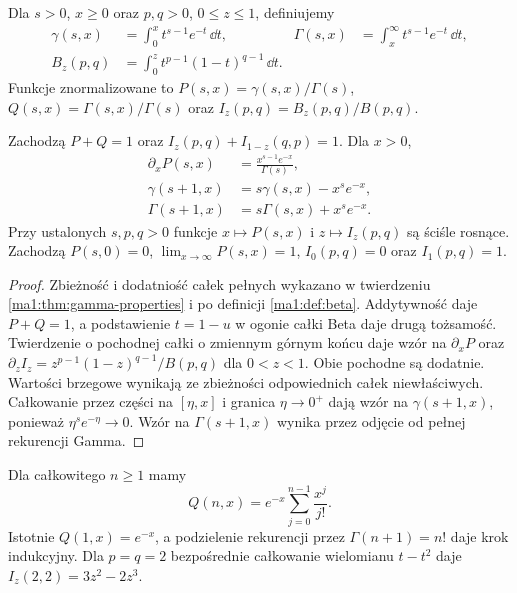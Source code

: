 \begin{definicja}
\label{ma1:def:incomplete-gamma-beta}
Dla $s>0$, $x\ge0$ oraz $p,q>0$, $0\le z\le1$,
definiujemy
\[
 \begin{aligned}
 \gamma(s,x)&=\int_0^x t^{s-1}e^{-t}\,\dd t,&
 \Gamma(s,x)&=\int_x^\infty t^{s-1}e^{-t}\,\dd t,\\
 B_z(p,q)&=\int_0^z t^{p-1}(1-t)^{q-1}\,\dd t.
 \end{aligned}
\]
Funkcje znormalizowane to $P(s,x)=\gamma(s,x)/\Gamma(s)$,
$Q(s,x)=\Gamma(s,x)/\Gamma(s)$ oraz
$I_z(p,q)=B_z(p,q)/B(p,q)$.
\end{definicja}
\begin{stwierdzenie}
\label{ma1:prop:incomplete-gamma-beta}
Zachodzą $P+Q=1$ oraz $I_z(p,q)+I_{1-z}(q,p)=1$.
Dla $x>0$,
\[
 \begin{aligned}
 \partial_x P(s,x)&=\frac{x^{s-1}e^{-x}}{\Gamma(s)},\\
 \gamma(s+1,x)&=s\gamma(s,x)-x^s e^{-x},\\
 \Gamma(s+1,x)&=s\Gamma(s,x)+x^s e^{-x}.
 \end{aligned}
\]
Przy ustalonych $s,p,q>0$ funkcje $x\mapsto P(s,x)$
i $z\mapsto I_z(p,q)$ są ściśle rosnące.
Zachodzą $P(s,0)=0$, $\lim_{x\to\infty}P(s,x)=1$,
$I_0(p,q)=0$ oraz $I_1(p,q)=1$.
\end{stwierdzenie}
\begin{proof}
Zbieżność i dodatniość całek pełnych wykazano
w twierdzeniu \ref{ma1:thm:gamma-properties}
i po definicji \ref{ma1:def:beta}.
Addytywność daje $P+Q=1$, a podstawienie $t=1-u$
w ogonie całki Beta daje drugą tożsamość.
Twierdzenie o pochodnej całki o zmiennym górnym
końcu daje wzór na $\partial_x P$ oraz
$\partial_z I_z=z^{p-1}(1-z)^{q-1}/B(p,q)$ dla $0<z<1$.
Obie pochodne są dodatnie. Wartości brzegowe
wynikają ze zbieżności odpowiednich całek niewłaściwych.
Całkowanie przez części na $[\eta,x]$ i granica
$\eta\to0^+$ dają wzór na $\gamma(s+1,x)$, ponieważ
$\eta^s e^{-\eta}\to0$. Wzór na $\Gamma(s+1,x)$
wynika przez odjęcie od pełnej rekurencji Gamma.
\end{proof}
Dla całkowitego $n\ge1$ mamy
\[
 Q(n,x)=e^{-x}\sum_{j=0}^{n-1}\frac{x^j}{j!}.
\]
Istotnie $Q(1,x)=e^{-x}$, a podzielenie rekurencji
przez $\Gamma(n+1)=n!$ daje krok indukcyjny.
Dla $p=q=2$ bezpośrednie całkowanie wielomianu
$t-t^2$ daje $I_z(2,2)=3z^2-2z^3$.

